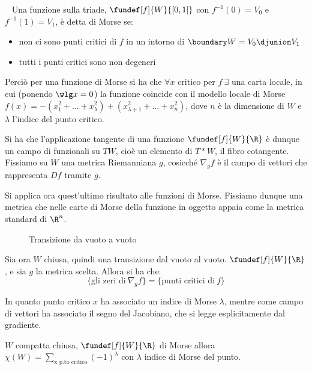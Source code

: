 \begin{defn}
~
Una funzione sulla triade, $\fundef[f]{W}{[0,1]}$ con $f^{-1}(0)=V_0$ e $f^{-1}(1)=V_1$, è detta di Morse se:
\begin{itemize}
\item non ci sono punti critici di $f$ in un intorno di $\boundary W = V_0\djunion V_1$
\item tutti i punti critici sono non degeneri
\end{itemize}
\end{defn}

Perciò per una funzione di Morse si ha che $\forall x$ critico per $f~\exists$ una carta locale, in cui (ponendo $\wlg x=0$) la funzione coincide con il modello locale di Morse $f(x) = -(x_1^2 + \dots + x_{\lambda}^2) + (x_{\lambda+1}^2 + \dots + x_n^2)$, dove $n$ è la dimensione di $W$ e $\lambda$ l'indice del punto critico.


Si ha che l'applicazione tangente di una funzione $\fundef[f]{W}{\R}$ è dunque un campo di funzionali su $TW$, cioè un elemento di $T*W$, il fibro cotangente.
Fissiamo su $W$ una metrica Riemanniana $g$, cosicché $\nabla _g f$ è il campo di vettori che rappresenta $Df$ tramite $g$.

Si applica ora quest'ultimo risultato alle funzioni di Morse. Fissiamo dunque una metrica che nelle carte di Morse della funzione in oggetto appaia come la metrica standard di $\R^n$.

\begin{figure}[h]
\centering

\caption{Transizione da vuoto a vuoto}
\end{figure}

Sia ora $W$ chiusa, quindi una transizione dal vuoto al vuoto. $\fundef[f]{W}{\R}$, e sia $g$ la metrica scelta. Allora si ha che:
\begin{equation*}
\{\text{gli zeri di}~\nabla_g f\} = \{\text{punti critici di}~f\}
\end{equation*}

In quanto punto critico $x$ ha associato un indice di Morse $\lambda$, mentre come campo di vettori ha associato il segno del Jacobiano, che si legge esplicitamente dal gradiente.

\begin{teo}
$W$ compatta chiusa, $\fundef[f]{W}{\R}$ di Morse allora $\chi(W)=\sum_{\text{x p.to critico}} (-1)^{\lambda}$ con $\lambda$ indice di Morse del punto.
\end{teo}

